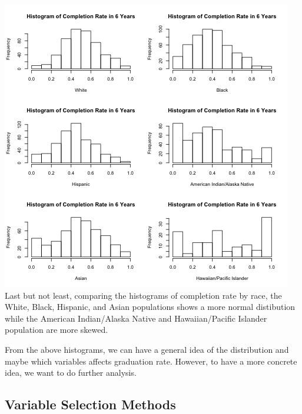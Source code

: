 \documentclass{article}
\begin{document}
\includegraphics{../../images/histogram_race_completion}
Last but not least, comparing the histograms of completion rate by race, the White, Black, Hispanic, and Asian populations shows a more normal distibution while the American Indian/Alaska Native and Hawaiian/Pacific Islander population are more skewed.

From the above histograms, we can have a general idea of the distribution and maybe which variables affects graduation rate. However, to have a more concrete idea, we want to do further analysis.


\subsection{Variable Selection Methods}
\end{document}

